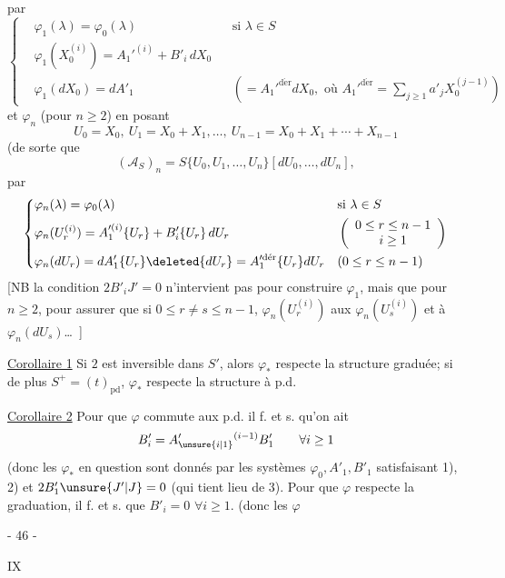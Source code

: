 par
\[
 \left\{\begin{aligned}
 &\varphi_1(\lambda)=\varphi_0(\lambda)&&\text{si }\lambda\in S\\
 &\varphi_1(X_0^{(i)})=A_1'^{(i)}+B'_i\,dX_0\\
 &\varphi_1(dX_0)=dA'_1&&\left(=A_1'^{\mathrm{d\acute er}}dX_0,\text{ où }A_1'^{\mathrm{d\acute er}}=\sum_{j\geq1}a'_jX_0^{(j-1)}\right)
 \end{aligned}\right.
\]
et $\varphi_n$ (pour $n\geq2$) en posant
\[
 U_0=X_0,\ U_1=X_0+X_1,\ldots,\ U_{n-1}=X_0+X_1+\cdots+X_{n-1}
\]
(de sorte que
\[
 (\mathcal A_S)_n=S\{U_0,U_1,\ldots,U_n\}[dU_0,\ldots,dU_n],
\]
par
\[
 \left\{\begin{aligned}
 &\varphi_n(\lambda)=\varphi_0(\lambda)&&\text{si }\lambda\in S\\
 &\varphi_n(U_r^{(i)})=A_1'^{(i)}\{U_r\}+B'_i\{U_r\}\,dU_r
 &&\left(\begin{array}{c}0\leq r\leq n-1\\i\geq1\end{array}\right)\\
 &\varphi_n(dU_r)=dA'_1\{U_r\}\deleted{dU_r}=A_1'^{\mathrm{d\acute er}}\{U_r\}dU_r
 &&(0\leq r\leq n-1)
 \end{aligned}\right.
\]
[NB la condition $2B'_iJ'=0$ n'intervient pas pour construire $\varphi_1$, mais que pour $n\geq2$, pour assurer que si $0\leq r\ne s\leq n-1$, $\varphi_n(U_r^{(i)})$   aux $\varphi_n(U_s^{(i)})$ et à $\varphi_n(dU_s)$\ldots\ ]

\uline{Corollaire 1} Si $2$ est inversible dans $S'$, alors $\varphi_*$ respecte la structure graduée; si de plus $S^+=(t)_{\mathrm{pd}}$, $\varphi_*$ respecte la structure à p.d.

\uline{Corollaire 2}  Pour que $\varphi$ commute aux p.d. il f. et s. qu'on ait
\[
 B'_i=A'_{\unsure{i|1}}{}^{(i-1)}B'_1\qquad\forall i\geq1
\]
(donc les $\varphi_*$ en question sont donnés par les systèmes $\varphi_0,A'_1,B'_1$ satisfaisant 1), 2) et $2B'_1\unsure{J'|J}=0$ (qui tient lieu de 3).
Pour que $\varphi$ respecte la graduation, il f. et s. que $B'_i=0$ $\forall i\geq1$. (donc les $\varphi$
\begin{center}- 46 -\end{center}\hfill IX

